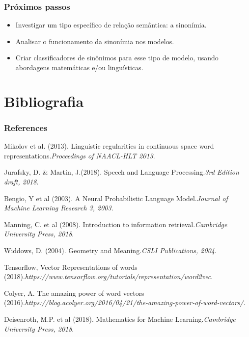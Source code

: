 \documentclass{beamer}
\begin{document}
\begin{frame}
\frametitle{ Próximos passos}
\begin{itemize}
\item Investigar um tipo específico de relação semântica: a sinonímia.
\item Analisar o funcionamento da sinonímia nos modelos.
\item Criar classificadores de sinônimos para esse tipo de modelo, usando abordagens matemáticas e/ou linguísticas.
\end{itemize}
\end{frame}


\section{Bibliografia}

\begin{frame}
\frametitle{References}
\footnotesize{
\begin{thebibliography}{} %
 Mikolov et al. (2013). Linguistic regularities in continuous space word representations.\emph{Proceedings of NAACL-HLT 2013}.

 Jurafsky, D. \& Martin, J.(2018). Speech and Language Processing.\emph{3rd Edition draft, 2018}.

 Bengio, Y et al (2003). A Neural Probabilistic Language Model.\emph{Journal of Machine Learning Research 3, 2003}.

 Manning, C. et al (2008). Introduction to information retrieval.\emph{Cambridge University Press, 2018}.

 Widdows, D. (2004). Geometry and Meaning.\emph{CSLI Publications, 2004}.

 Tensorflow, Vector Representations of words (2018).\emph{https://www.tensorflow.org/tutorials/representation/word2vec}.

 Colyer, A. The amazing power of word vectors (2016).\emph{https://blog.acolyer.org/2016/04/21/the-amazing-power-of-word-vectors/}.

 Deisenroth, M.P. et al (2018). Mathematics for Machine Learning.\emph{Cambridge University Press, 2018}.
\end{thebibliography}
}
\end{frame}
\end{document}
